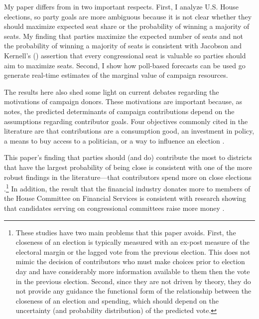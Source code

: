 \documentclass[12pt,final,fleqn]{article}
\theoremstyle{plain}
\begin{document}
My paper differs from \citet*{stromberg2008electoral} in two important respects. First, I analyze U.S. House elections, so party goals are more ambiguous because it is not clear whether they should maximize expected seat share or the probability of winning a majority of seats.  My finding that parties maximize the expected number of seats and not the probability of winning a majority of seats is consistent with Jacobson and Kernell's (\citeyear{jacobson1985party}) assertion that every congressional seat is valuable so parties should aim to maximize seats. Second, I show how poll-based forecasts can be used go generate real-time estimates of the marginal value of campaign resources.

The results here also shed some light on current debates regarding the motivations of campaign donors. These motivations are important because, as \citet{stratmann2005some} notes, the predicted determinants of campaign contributions depend on the assumptions regarding contributor goals. Four objectives commonly cited in the literature are that contributions are a consumption good, an investment in policy, a means to buy access to a politician, or a way to influence an election \citep[e.g.][]{ansolabehere2003there, stratmann2005some}. 

This paper's finding that parties should (and do) contribute the most to districts that have the largest probability of being close is consistent with one of the more robust findings in the literature---that contributors spend more on close elections \citep{kau1982general, jacobson1985money, poole1985patterns, stratmann1991campaign}.\footnote{These studies have two main problems that this paper avoids. First, the closeness of an election is typically measured with an ex-post measure of the electoral margin or the lagged vote from the previous election. This does not mimic the decision of contributors who must make choices prior to election day and have considerably more information available to them then the vote in the previous election. Second, since they are not driven by theory, they do not provide any guidance the functional form of the relationship between the closeness of an election and spending, which should depend on the uncertainty (and probability distribution) of the predicted vote.} In addition, the result that the financial industry donates more to members of the House Committee on Financial Services is consistent with research showing that candidates serving on congressional committees raise more money \citep{grier1991committee, romer1994empirical, kroszner1998interest}.  
\end{document}

